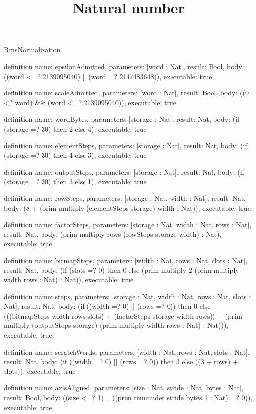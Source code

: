 \begin{lexlean}{RmsNormalization}
\title{Natural number}
\begin{semanticmodule}
definition{
  name: epsilonAdmitted,
  parameters: [word : Nat],
  result: Bool,
  body: ((word <=? 2139095040) || (word =? 2147483648)),
  executable: true
}

definition{
  name: scaleAdmitted,
  parameters: [word : Nat],
  result: Bool,
  body: ((0 <? word) && (word <=? 2139095040)),
  executable: true
}

definition{
  name: wordBytes,
  parameters: [storage : Nat],
  result: Nat,
  body: (if (storage =? 30) then 2 else 4),
  executable: true
}

definition{
  name: elementSteps,
  parameters: [storage : Nat],
  result: Nat,
  body: (if (storage =? 30) then 4 else 3),
  executable: true
}

definition{
  name: outputSteps,
  parameters: [storage : Nat],
  result: Nat,
  body: (if (storage =? 30) then 3 else 1),
  executable: true
}

definition{
  name: rowSteps,
  parameters: [storage : Nat, width : Nat],
  result: Nat,
  body: (8 + (prim multiply (elementSteps storage) width : Nat)),
  executable: true
}

definition{
  name: factorSteps,
  parameters: [storage : Nat, width : Nat, rows : Nat],
  result: Nat,
  body: (prim multiply rows (rowSteps storage width) : Nat),
  executable: true
}

definition{
  name: bitmapSteps,
  parameters: [width : Nat, rows : Nat, slots : Nat],
  result: Nat,
  body: (if (slots =? 0) then 0 else (prim multiply 2 (prim multiply width rows : Nat) : Nat)),
  executable: true
}

definition{
  name: steps,
  parameters: [storage : Nat, width : Nat, rows : Nat, slots : Nat],
  result: Nat,
  body: (if ((width =? 0) || (rows =? 0)) then 0 else (((bitmapSteps width rows slots) + (factorSteps storage width rows)) + (prim multiply (outputSteps storage) (prim multiply width rows : Nat) : Nat))),
  executable: true
}

definition{
  name: scratchWords,
  parameters: [width : Nat, rows : Nat, slots : Nat],
  result: Nat,
  body: (if ((width =? 0) || (rows =? 0)) then 3 else ((3 + rows) + slots)),
  executable: true
}

definition{
  name: axisAligned,
  parameters: [size : Nat, stride : Nat, bytes : Nat],
  result: Bool,
  body: ((size <=? 1) || ((prim remainder stride bytes 1 : Nat) =? 0)),
  executable: true
}


\end{semanticmodule}
\end{lexlean}
